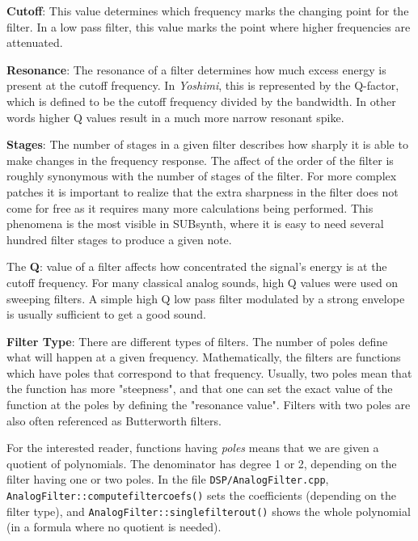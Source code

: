    \textbf{Cutoff}:
   This value determines which frequency marks the changing point for
   the filter. In a low pass filter, this value marks the point where higher
   frequencies are attenuated.

   \textbf{Resonance}:
   The resonance of a filter determines how much excess energy is
   present at the cutoff frequency. In \textsl{Yoshimi},
   this is represented by the Q-factor, which is defined to be the cutoff
   frequency divided by the bandwidth. In other words higher Q values result
   in a much more narrow resonant spike.

   \textbf{Stages}:
   The number of stages in a given filter describes how sharply it is
   able to make changes in the frequency response.
   The affect of the order of the filter is roughly synonymous with the
   number of stages of the filter. For more complex patches it is important
   to realize that the extra sharpness in the filter does not come for free
   as it requires many more calculations being performed. This phenomena is
   the most visible in SUBsynth, where it is easy to need several hundred
   filter stages to produce a given note.

   The \textbf{Q}:
   value of a filter affects how concentrated the signal’s energy is at
   the cutoff frequency.
   For many classical analog sounds, high Q values were used on sweeping
   filters. A simple high Q low pass filter modulated by a strong envelope is
   usually sufficient to get a good sound.

   \textbf{Filter Type}:
   There are different types of filters. The number of poles define what will
   happen at a given frequency. Mathematically, the filters are functions
   which have poles that correspond to that frequency. Usually, two poles
   mean that the function has more "steepness", and that one can set the
   exact value of the function at the poles by defining the "resonance
   value". Filters with two poles are also often referenced as Butterworth
   filters.

   For the interested reader, functions having \textsl{poles}
   means that we are given a quotient of polynomials. The denominator has
   degree 1 or 2, depending on the filter having one or two poles. In the
   file \texttt{DSP/AnalogFilter.cpp},
   \texttt{AnalogFilter::computefiltercoefs()} sets the coefficients
   (depending on the filter type), and
   \texttt{AnalogFilter::singlefilterout()} shows the whole polynomial (in a
   formula where no quotient is needed).

